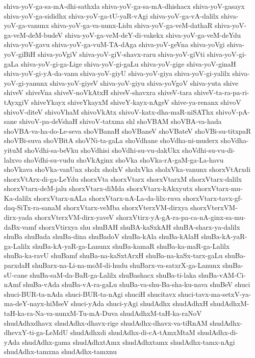 {shiva-yoV-ga-sa-mA-dhi-sathxla
shiva-yoV-ga-sa-mA-dhishacx
shiva-yoV-gasayx
shiva-yoV-ga-sididhx
shiva-yoV-ga-tU-yaR-vAgi
shiva-yoV-ga-vA-dalilx
shiva-yoV-ga-vanunx
shiva-yoV-ga-va-nunx-Lidu
shiva-yoV-ga-veM-dathaR
shiva-yoV-ga-veM-deM-budeV
shiva-yoV-ga-veM-deY-di-vakekx
shiva-yoV-ga-veM-deYdu
shiva-yoV-gavu
shiva-yoV-ga-vuM-TA-dAga
shiva-yoV-geVna
shiva-yoVgi
shiva-yoV-giBiH
shiva-yoVgiV
shiva-yoV-giV-shavx-raru
shiva-yoV-giVti
shiva-yoV-gi-gaLa
shiva-yoV-gi-ga-Lige
shiva-yoV-gi-gaLu
shiva-yoV-gige
shiva-yoV-ginaH
shiva-yoV-gi-yA-da-vanu
shiva-yoV-giyU
shiva-yoV-giya
shiva-yoV-gi-yalilx
shiva-yoV-gi-yanunx
shiva-yoV-giyeV
shiva-yoV-giyu
shiva-yoVgoV
shiva-yuta
shive
shiveV
shiveVna
shiveV-noVkAtxH
shiveV-shavxra
shiveV-tara
shiveV-ta-ra-pa-ri-tAyxgiV
shiveYkayx
shiveYkayxM
shiveY-kayx-nAgeV
shive-ya-renanx
shivoV
shivoV-diteV
shivoVhaM
shivoVkAtx
shivoV-katx-dha-maR-niSAThx
shivoV-pA-sane
shivoV-pa-deVshaH
shivoV-tatxma
shl
shoVBAM
shoVBA-va-hada
shoVBA-va-ha-do-Le-seva
shoVBanaH
shoVBaneV
shoVBateV
shoVBi-su-titxpaR
shoVBi-suva
shoVBitA
shoVNi-ta-gaLa
shoVdhane
shoVdha-ni-muderx
shoVdha-yituM
shoVdhi-sa-beVku
shoVdhisi
shoVdhi-su-vu-dakUkx
shoVdhi-su-vu-di-lalxvo
shoVdhi-su-vudu
shoVkAginx
shoVka
shoVka-rA-gaM-ga-La-havu
shoVkava
shoVka-vanUnx
sholx
sholxV
sholxVka
sholxVka-vanunx
shorxVtArxdi
shorxVtArx-di-ga-LeYdu
shorxVta
shorxVtarx
shorxVtarxM
shorxVtarx-dalilx
shorxVtarx-deM-jalu
shorxVtarx-diMda
shorxVtarx-kAkxyutx
shorxVtarx-mu-Ka-dalilx
shorxVtarx-nALa
shorxVtarx-nA-La-da-lilx-ruva
shorxVtarx-tavx-gf-daq-SiTx-ra-sanaM
shorxVtarx-veMba
shorxVterxVM-dirxya
shorxVterxVM-dirx-yada
shorxVterxVM-dirx-yaveV
shorxVtirx-yA-gA-ra-pa-ca-nA-ginx-sa-mu-daBx-vamf
shorxVtirxya
shu
shuBAH
shuBA-kaSxkAH
shuBA-sharx-ya-dalilx
shuBa
shuBada
shuBa-dina
shuBadoV
shuBa-kAla
shuBa-kAlaH
shuBa-kA-yaR-ga-Lalilx
shuBa-kA-yaR-ga-Lanunx
shuBa-kamaR
shuBa-ka-maR-ga-Lalilx
shuBa-ka-ravU
shuBamf
shuBa-na-kaSxtArxH
shuBa-na-kaSx-tarx-gaLu
shuBa-parxdaH
shuBarx-na-Li-na-moM-di-hudu
shuBarx-va-satxrX-ga-Lanunx
shuBa-sU-cane
shuBa-saM-da-BaR-ga-Lalilx
shuBashacx
shuBa-ti-laka
shuBa-vAM-Ci-nAmf
shuBa-vAda
shuBa-vA-ra-gaLu
shuBa-va-shu-Ba-sha-ku-nava
shuBeV
shuci
shuci-BUR-ta-nAda
shuci-BUR-ta-nAgi
shuciH
shucitavx
shuci-tavx-ma-setxV-ya-ma-deY-nayx-hiMseV
shuci-yAda
shuci-yAgi
shudAdhx
shudAdhxH
shudAdhxM-taH-ka-ra-Na-va-nunxM-Tu-mA-Duva
shudAdhxM-taH-ka-raNoV
shudAdhxdhavx
shudAdhx-dhavx-rige
shudAdhx-dhavx-va-tiRnAM
shudAdhx-dhevxY-ti-ga-LeMdU
shudAdhxdi
shudAdhx-di-cA-tAmxMtaM
shudAdhx-di-yAda
shudAdhx-gama
shudAdhxtAmx
shudAdhxtamx
shudAdhx-tamx-nAgi
shudAdhx-tamxna
shudAdhx-tamxnu
}
